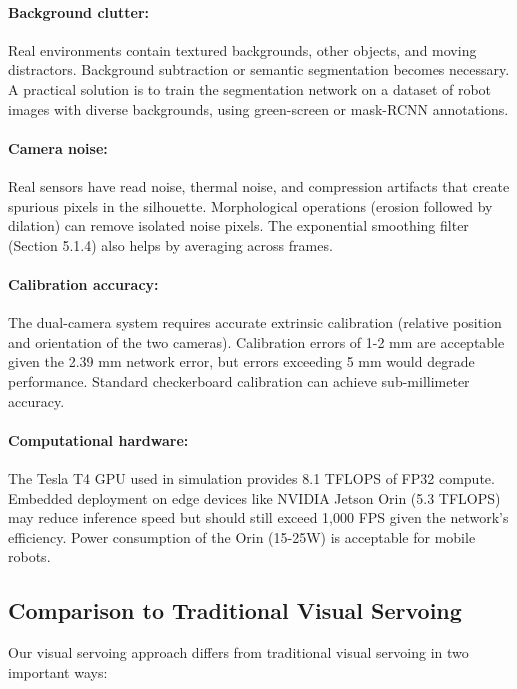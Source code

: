 ﻿\documentclass[12pt,a4paper,oneside]{report}
\begin{document}
\paragraph{Background clutter:} Real environments contain textured backgrounds, other objects, and moving distractors. Background subtraction or semantic segmentation becomes necessary. A practical solution is to train the segmentation network on a dataset of robot images with diverse backgrounds, using green-screen or mask-RCNN annotations.

\paragraph{Camera noise:} Real sensors have read noise, thermal noise, and compression artifacts that create spurious pixels in the silhouette. Morphological operations (erosion followed by dilation) can remove isolated noise pixels. The exponential smoothing filter (Section 5.1.4) also helps by averaging across frames.

\paragraph{Calibration accuracy:} The dual-camera system requires accurate extrinsic calibration (relative position and orientation of the two cameras). Calibration errors of 1-2 mm are acceptable given the 2.39 mm network error, but errors exceeding 5 mm would degrade performance. Standard checkerboard calibration can achieve sub-millimeter accuracy.

\paragraph{Computational hardware:} The Tesla T4 GPU used in simulation provides 8.1 TFLOPS of FP32 compute. Embedded deployment on edge devices like NVIDIA Jetson Orin (5.3 TFLOPS) may reduce inference speed but should still exceed 1,000 FPS given the network's efficiency. Power consumption of the Orin (15-25W) is acceptable for mobile robots.

\subsection{Comparison to Traditional Visual Servoing}

Our visual servoing approach differs from traditional visual servoing in two important ways:
\end{document}
